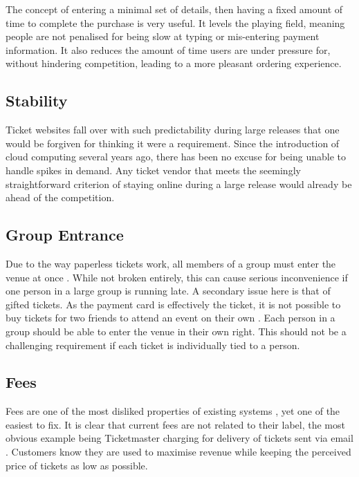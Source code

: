 \documentclass[12pt,a4paper]{bhamdissertation}
\begin{document}
The concept of entering a minimal set of details, then having a fixed amount of time to complete the purchase is very useful. It levels the playing field, meaning people are not penalised for being slow at typing or mis-entering payment information. It also reduces the amount of time users are under pressure for, without hindering competition, leading to a more pleasant ordering experience.

\subsection{Stability}

Ticket websites fall over with such predictability during large releases \cite{B10} that one would be forgiven for thinking it were a requirement. Since the introduction of cloud computing several years ago, there has been no excuse for being unable to handle spikes in demand. Any ticket vendor that meets the seemingly straightforward criterion of staying online during a large release would already be ahead of the competition.

\subsection{Group Entrance}

Due to the way paperless tickets work, all members of a group must enter the venue at once \cite{T166}. While not broken entirely, this can cause serious inconvenience if one person in a large group is running late. A secondary issue here is that of gifted tickets. As the payment card is effectively the ticket, it is not possible to buy tickets for two friends to attend an event on their own \cite{T166}. Each person in a group should be able to enter the venue in their own right. This should not be a challenging requirement if each ticket is individually tied to a person.

\subsection{Fees}

Fees are one of the most disliked properties of existing systems \cite{P12}, yet one of the easiest to fix. It is clear that current fees are not related to their label, the most obvious example being Ticketmaster charging for delivery of tickets sent via email \cite{P12}. Customers know they are used to maximise revenue while keeping the perceived price of tickets as low as possible.
\end{document}
